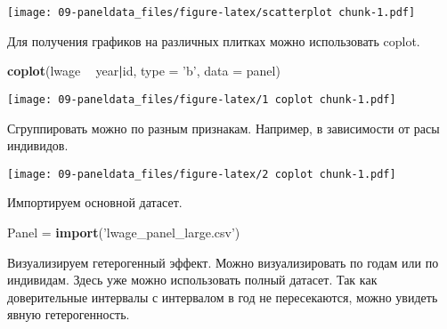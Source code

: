 \documentclass[]{article}
\newenvironment{Shaded}{\begin{snugshade}}{\end{snugshade}}
\newcommand{\ControlFlowTok}[1]{\textcolor[rgb]{0.13,0.29,0.53}{\textbf{#1}}}
\newcommand{\DataTypeTok}[1]{\textcolor[rgb]{0.13,0.29,0.53}{#1}}
\newcommand{\DecValTok}[1]{\textcolor[rgb]{0.00,0.00,0.81}{#1}}
\newcommand{\FloatTok}[1]{\textcolor[rgb]{0.00,0.00,0.81}{#1}}
\newcommand{\KeywordTok}[1]{\textcolor[rgb]{0.13,0.29,0.53}{\textbf{#1}}}
\newcommand{\NormalTok}[1]{#1}
\newcommand{\OperatorTok}[1]{\textcolor[rgb]{0.81,0.36,0.00}{\textbf{#1}}}
\newcommand{\StringTok}[1]{\textcolor[rgb]{0.31,0.60,0.02}{#1}}
\begin{document}
\texttt{[image: 09-paneldata\_files/figure-latex/scatterplot chunk-1.pdf]}

Для получения графиков на различных плитках можно использовать coplot.

\begin{Shaded}
\begin{Highlighting}[]
\KeywordTok{coplot}\NormalTok{(lwage }\OperatorTok{~}\StringTok{ }\NormalTok{year}\OperatorTok{|}\NormalTok{id, }\DataTypeTok{type =} \StringTok{'b'}\NormalTok{, }\DataTypeTok{data =}\NormalTok{ panel)}
\end{Highlighting}
\end{Shaded}

\texttt{[image: 09-paneldata\_files/figure-latex/1 coplot chunk-1.pdf]}

Сгруппировать можно по разным признакам. Например, в зависимости от расы
индивидов.

\begin{Shaded}
\end{Shaded}

\texttt{[image: 09-paneldata\_files/figure-latex/2 coplot chunk-1.pdf]}

Импортируем основной датасет.

\begin{Shaded}
\begin{Highlighting}[]
\NormalTok{Panel =}\StringTok{ }\KeywordTok{import}\NormalTok{(}\StringTok{'lwage_panel_large.csv'}\NormalTok{)}
\end{Highlighting}
\end{Shaded}

Визуализируем гетерогенный эффект. Можно визуализировать по годам или по
индивидам. Здесь уже можно использовать полный датасет. Так как
доверительные интервалы с интервалом в год не пересекаются, можно
увидеть явную гетерогенность.
\end{document}
